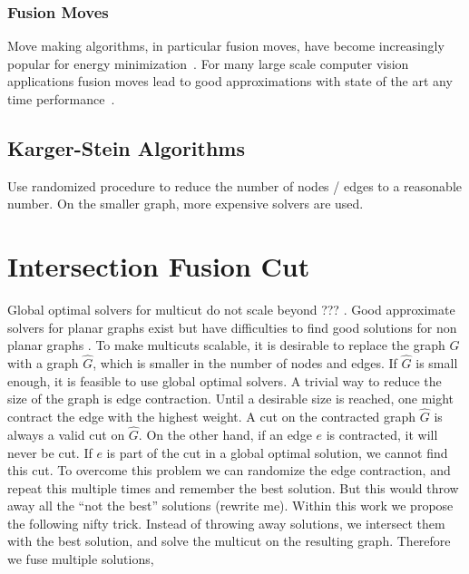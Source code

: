 \documentclass[10pt,twocolumn,letterpaper]{article}
\begin{document}
\subsubsection{Fusion Moves}
Move making algorithms, in particular fusion moves, 
have become increasingly popular for energy minimization~\cite{???,kappes_2014_ws}.
For many large scale computer vision applications fusion moves lead to good approximations
with state of the art any time performance~\cite{kappes_2014_ws}.




\subsection{Karger-Stein Algorithms}
Use randomized procedure to reduce the number of nodes / edges to a reasonable 
number.
On the smaller graph, more expensive solvers are used.



\section{Intersection Fusion Cut}

Global optimal solvers for multicut do not scale beyond ??? \cite{???}.
Good approximate solvers for planar graphs exist \cite{beier_2014_cvpr,yarkony_2012_eccv} 
but have difficulties to find good solutions for non planar graphs \cite{beier_2014_cvpr}.
%
To make multicuts scalable, it is desirable to replace the graph $G$
with a graph $\hat{G}$, which is smaller in the number of nodes and edges. 
If $\hat{G}$ is small enough, it is feasible to use global optimal solvers.
%
A trivial way to reduce the size of the graph  is edge contraction.
Until a desirable size is reached, one might contract the edge with
the highest weight. A cut on the contracted graph  $\hat{G}$ is always
a valid cut on $\hat{G}$.
%
On the other hand, if an edge $e$ is contracted, it will never be cut.
If $e$ is part of the cut in a global optimal solution, we cannot find
this cut.
%
To overcome this problem  we can randomize the edge contraction,
and repeat this multiple times and remember the best solution.
%
But this would throw away all the ``not the best'' solutions (rewrite me).
Within this work we propose the following nifty trick.
Instead of throwing away solutions, we intersect them with the 
best solution, and solve the multicut on the resulting
graph.
Therefore we fuse multiple solutions,
\end{document}
